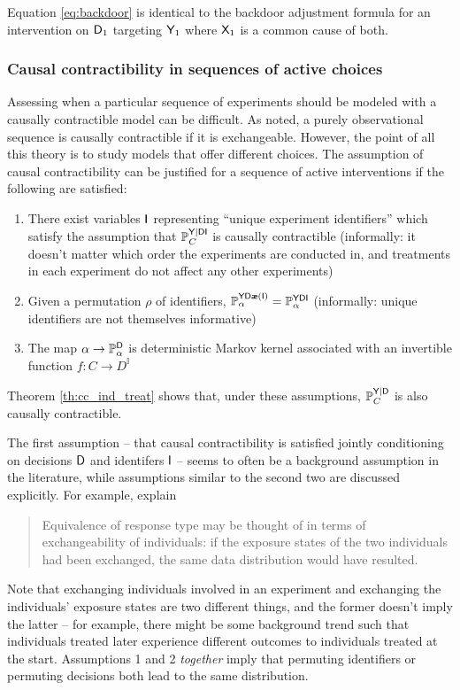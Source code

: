 Equation \ref{eq:backdoor} is identical to the backdoor adjustment formula for an intervention on $\mathsf{D}_1$ targeting $\mathsf{Y}_1$ where $\mathsf{X}_1$ is a common cause of both.

\subsubsection{Causal contractibility in sequences of active choices}\label{sec:assessing}

Assessing when a particular sequence of experiments should be modeled with a causally contractible model can be difficult. As noted, a purely observational sequence is causally contractible if it is exchangeable. However, the point of all this theory is to study models that offer different choices. The assumption of causal contractibility can be justified for a sequence of active interventions if the following are satisfied:
\begin{enumerate}
    \item There exist variables $\mathsf{I}$ representing ``unique experiment identifiers'' which satisfy the assumption that $\mathbb{P}_C^{\mathsf{Y}|\mathsf{DI}}$ is causally contractible (informally: it doesn't matter which order the experiments are conducted in, and treatments in each experiment do not affect any other experiments)
    \item Given a permutation $\rho$ of identifiers, $\mathbb{P}_\alpha^{\mathsf{YD\rho(\mathsf{I})}}=\mathbb{P}_\alpha^{\mathsf{YDI}}$ (informally: unique identifiers are not themselves informative)
    \item The map $\alpha\to \mathbb{P}_\alpha^{\mathsf{D}}$ is deterministic Markov kernel associated with an invertible function $f:C\to D^{\mathbb{I}}$
\end{enumerate}

Theorem \ref{th:cc_ind_treat} shows that, under these assumptions, $\mathbb{P}_C^{\mathsf{Y}|\mathsf{D}}$ is also causally contractible.

The first assumption -- that causal contractibility is satisfied jointly conditioning on decisions $\mathsf{D}$ and identifers $\mathsf{I}$ -- seems to often be a background assumption in the literature, while assumptions similar to the second two are discussed explicitly. For example, \citet{greenland_identifiability_1986} explain
\begin{quote}
    Equivalence of response type may be thought of in terms of exchangeability of individuals: if the exposure states of the two individuals had been exchanged, the same data distribution would have resulted.
\end{quote}
Note that exchanging individuals involved in an experiment and exchanging the individuals' exposure states are two different things, and the former doesn't imply the latter -- for example, there might be some background trend such that individuals treated later experience different outcomes to individuals treated at the start. Assumptions 1 and 2 \emph{together} imply that permuting identifiers or permuting decisions both lead to the same distribution.

